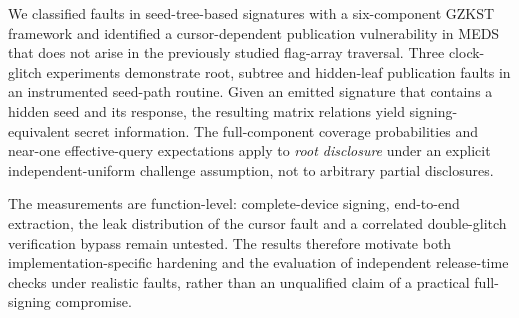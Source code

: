 We classified faults in seed-tree-based signatures with a six-component
GZKST framework and identified a cursor-dependent publication vulnerability
in MEDS that does not arise in the previously studied flag-array traversal.
Three clock-glitch experiments demonstrate root, subtree and hidden-leaf
publication faults in an instrumented seed-path routine. Given an emitted
signature that contains a hidden seed and its response, the resulting matrix
relations yield signing-equivalent secret information. The full-component
coverage probabilities and near-one effective-query expectations apply to
\emph{root disclosure} under an explicit independent-uniform challenge
assumption, not to arbitrary partial disclosures.

The measurements are function-level: complete-device signing,
end-to-end extraction, the leak distribution of the cursor fault and a
correlated double-glitch verification bypass remain untested. The results
therefore motivate both implementation-specific hardening and the evaluation
of independent release-time checks under realistic faults, rather than an
unqualified claim of a practical full-signing compromise.

